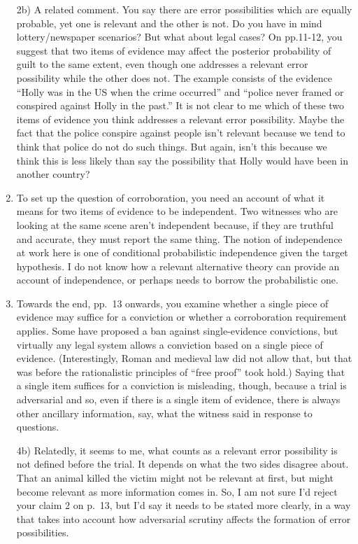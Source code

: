 \documentclass[
  11pt,
  dvipsnames,enabledeprecatedfontcommands]{scrartcl}
\begin{document}
\begin{enumerate}
  2b) A related comment. You say there are error possibilities which are
  equally probable, yet one is relevant and the other is not. Do you
  have in mind lottery/newspaper scenarios? But what about legal cases?
  On pp.11-12, you suggest that two items of evidence may affect the
  posterior probability of guilt to the same extent, even though one
  addresses a relevant error possibility while the other does not. The
  example consists of the evidence ``Holly was in the US when the crime
  occurred'' and ``police never framed or conspired against Holly in the
  past.'' It is not clear to me which of these two items of evidence you
  think addresses a relevant error possibility. Maybe the fact that the
  police conspire against people isn't relevant because we tend to think
  that police do not do such things. But again, isn't this because we
  think this is less likely than say the possibility that Holly would
  have been in another country?
\item
  To set up the question of corroboration, you need an account of what
  it means for two items of evidence to be independent. Two witnesses
  who are looking at the same scene aren't independent because, if they
  are truthful and accurate, they must report the same thing. The notion
  of independence at work here is one of conditional probabilistic
  independence given the target hypothesis. I do not know how a relevant
  alternative theory can provide an account of independence, or perhaps
  needs to borrow the probabilistic one.
\item
  Towards the end, pp.~13 onwards, you examine whether a single piece of
  evidence may suffice for a conviction or whether a corroboration
  requirement applies. Some have proposed a ban against single-evidence
  convictions, but virtually any legal system allows a conviction based
  on a single piece of evidence. (Interestingly, Roman and medieval law
  did not allow that, but that was before the rationalistic principles
  of ``free proof'' took hold.) Saying that a single item suffices for a
  conviction is misleading, though, because a trial is adversarial and
  so, even if there is a single item of evidence, there is always other
  ancillary information, say, what the witness said in response to
  questions.

  4b) Relatedly, it seems to me, what counts as a relevant error
  possibility is not defined before the trial. It depends on what the
  two sides disagree about. That an animal killed the victim might not
  be relevant at first, but might become relevant as more information
  comes in. So, I am not sure I'd reject your claim 2 on p.~13, but I'd
  say it needs to be stated more clearly, in a way that takes into
  account how adversarial scrutiny affects the formation of error
  possibilities.
\end{enumerate}
\end{document}
